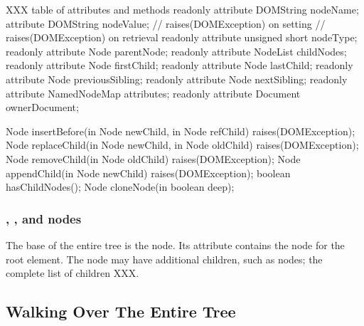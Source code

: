 \documentclass{howto}
\begin{document}
XXX table of attributes and methods
            readonly attribute  DOMString            nodeName;
                     attribute  DOMString            nodeValue;
                                                           // raises(DOMException) on setting
                                                           // raises(DOMException) on retrieval
            readonly attribute  unsigned short       nodeType;
            readonly attribute  Node                 parentNode;
            readonly attribute  NodeList             childNodes;
            readonly attribute  Node                 firstChild;
            readonly attribute  Node                 lastChild;
            readonly attribute  Node                 previousSibling;
            readonly attribute  Node                 nextSibling;
            readonly attribute  NamedNodeMap         attributes;
            readonly attribute  Document             ownerDocument;

            Node                      insertBefore(in Node newChild,
                                                   in Node refChild)
                                                   raises(DOMException);
            Node                      replaceChild(in Node newChild,
                                                   in Node oldChild)
                                                   raises(DOMException);
            Node                      removeChild(in Node oldChild)
                                                  raises(DOMException);
            Node                      appendChild(in Node newChild)
                                                  raises(DOMException);
            boolean                   hasChildNodes();
            Node                      cloneNode(in boolean deep);


\subsubsection{, , and  nodes}

The base of the entire tree is the  node.  Its
 attribute contains the  node
for the root element.  The  node may have additional
children, such as  nodes; the complete list of children XXX.


\subsection{Walking Over The Entire Tree}
\end{document}
